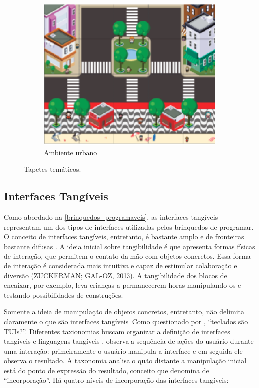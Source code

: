 \begin{figure}[!htbp]
\begin{subfigure}{.33\textwidth}
        \centering
        \includegraphics[width=.9\linewidth,fbox]{figs/tapete_city.png}
        \caption{Ambiente urbano}
        \label{tapete_city}
    \end{subfigure}
    \caption{Tapetes temáticos.}
    \sourceauthor
    \label{rope_mats}
\end{figure}

\subsection{Interfaces Tangíveis}
\label{fundamentacao_sub_interfaces_tangiveis}
Como abordado na \autoref{brinquedos_programaveis}, as interfaces tangíveis representam um dos tipos de interfaces utilizadas pelos brinquedos de programar. O conceito de interfaces tangíveis, entretanto, é bastante amplo e de fronteiras bastante difusas \cite{falcao_design_2007}. A ideia inicial sobre tangibilidade é que apresenta formas físicas de interação, que permitem o contato da mão com objetos concretos. Essa forma de interação é considerada mais intuitiva e capaz de estimular colaboração e diversão (ZUCKERMAN; GAL-OZ, 2013). A tangibilidade dos blocos de encaixar, por exemplo, leva crianças a permanecerem horas manipulando-os e testando possibilidades de construções. 

Somente a ideia de manipulação de objetos concretos, entretanto, não delimita claramente o que são interfaces tangíveis. Como questionado por , “teclados são TUIs?”. Diferentes taxionomias buscam organizar a definição de interfaces tangíveis e linguagens tangíveis \cite{fishkin_taxonomy_2004, fincher_tangible_2019}.  observa a sequência de ações do usuário durante uma interação: primeiramente o usuário manipula a interface e em seguida ele observa o resultado. A taxonomia analisa o quão distante a manipulação inicial está do ponto de expressão do resultado, conceito que denomina de “incorporação”. Há quatro níveis de incorporação das interfaces tangíveis:

